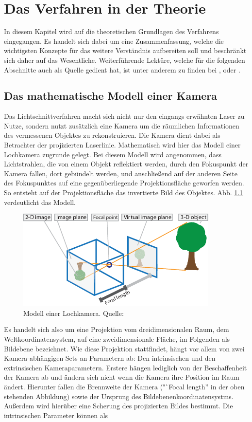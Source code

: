\chapter{Das Verfahren in der Theorie}
In diesem Kapitel wird auf die theoretischen Grundlagen des Verfahrens eingegangen. Es handelt sich dabei um eine Zusammenfassung, welche die wichtigsten Konzepte für das weitere Verständnis aufbereiten soll und beschränkt sich daher auf das Wesentliche. Weiterführende Lektüre, welche für die folgenden Abschnitte auch als Quelle gedient hat, ist unter anderem zu finden bei \cite{Simek:12}, \cite{Mathworks:17b} oder \cite{Rahmann}.

\section{Das mathematische Modell einer Kamera}
Das Lichtschnittverfahren macht sich nicht nur den eingangs erwähnten Laser zu Nutze, sondern nutzt zusätzlich eine Kamera um die räumlichen Informationen des vermessenen Objektes zu rekonstruieren. Die Kamera dient dabei als Betrachter der projizierten Laserlinie. Mathematisch wird hier das Modell einer Lochkamera zugrunde gelegt. Bei diesem Modell wird angenommen, dass Lichtstrahlen, die von einem Objekt reflektiert werden, durch den Fokuspunkt der Kamera fallen, dort gebündelt werden, und anschließend auf der anderen Seite des Fokuspunktes auf eine gegenüberliegende Projektionsfläche geworfen werden. So entsteht auf der Projektionsfläche das invertierte Bild des Objektes. Abb. \ref{fig:lochkamera} verdeutlicht das Modell. 

\begin{figure}
\centering \includegraphics{images/lochkamera.png}
\caption[Modell einer Lochkamera]{Modell einer Lochkamera. Quelle: \cite{Mathworks:17b}}\label{fig:lochkamera}
\end{figure}

Es handelt sich also um eine Projektion vom dreidimensionalen Raum, dem Weltkoordinatensystem, auf eine zweidimensionale Fläche, im Folgenden als Bildebene bezeichnet. Wie diese Projektion stattfindet, hängt vor allem von zwei Kamera-abhängigen Sets an Parametern ab: Den intrinsischen und den extrinsischen Kameraparametern. Erstere hängen lediglich von der Beschaffenheit der Kamera ab und ändern sich nicht wenn die Kamera ihre Position im Raum ändert. Hierunter fallen die Brennweite der Kamera ("`Focal length'' in der oben stehenden Abbildung) sowie der Ursprung des Bildebenenkoordinatensystms. Außerdem wird hierüber eine Scherung des projizierten Bildes bestimmt. Die intrinsischen Parameter können als 

